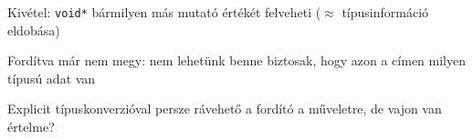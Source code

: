 \documentclass[usenames,dvipsnames,aspectratio=169]{beamer}
\begin{document}
\begin{frame}
  \begin{compactitem}
    \small
    \item Kivétel: \texttt{void*} bármilyen más mutató értékét felveheti ($\approx$ típusinformáció eldobása)
  \end{compactitem}
  \begin{exampleblock}{}
    \vspace{-.2cm}
    \small
    
    \vspace{-.2cm}
  \end{exampleblock}
  \begin{compactitem}
    \small
    \item Fordítva már nem megy: nem lehetünk benne biztosak, hogy azon a címen milyen típusú adat van
    \item Explicit típuskonverzióval persze rávehető a fordító a műveletre, de vajon van értelme?
  \end{compactitem}
  \begin{alertblock}{}
    \vspace{-.2cm}
    \small
    
    \vspace{-.2cm}
  \end{alertblock}
\end{frame}
\end{document}
